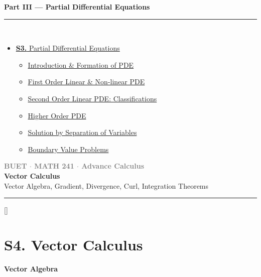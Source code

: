 \documentclass[12pt,a3paper]{article}
\newcommand{\subtopic}[2]{%
  \vspace{10pt}
  \noindent\begin{tcolorbox}[colback=#1!8,colframe=#1,boxrule=0.6pt,arc=4pt,
    left=6pt,right=6pt,top=4pt,bottom=4pt]
    \small\bfseries\textcolor{#1}{#2}
  \end{tcolorbox}
  \vspace{2pt}
}
\newcommand{\secdivider}[3]{%
  \newpage\thispagestyle{empty}%
  \vspace*{\fill}%
  \begin{tcolorbox}[enhanced,colback=#3!6,colframe=#3,boxrule=1.5pt,arc=8pt,
    left=20pt,right=20pt,top=22pt,bottom=22pt,
    shadow={3pt}{-3pt}{0pt}{black!15}]
    \centering
    {\large\textcolor{gray}{\textbf{BUET $\cdot$ MATH 241 $\cdot$ Advance Calculus}}}\\[8pt]
    {\fontsize{26}{32}\selectfont\bfseries\textcolor{#3}{#1}}\\[6pt]
    {\fontsize{15}{19}\selectfont\textcolor{dgray}{#2}}\\[12pt]
    \textcolor{#3!60}{\rule{0.5\textwidth}{0.5pt}}
  \end{tcolorbox}%
  \vspace*{\fill}\newpage%
}
\begin{document}
\begin{tcolorbox}[breakable,colback=cF!5,colframe=cF,boxrule=1pt,arc=5pt,
  left=8pt,right=8pt,top=8pt,bottom=8pt,before skip=4pt]
  {\large\bfseries\textcolor{cF}{Part III --- Partial Differential Equations}}\\[5pt]
  \textcolor{cF!40}{\rule{\textwidth}{0.4pt}}\\[3pt]
  \small\begin{itemize}[leftmargin=1.2em,itemsep=1pt,label={\textcolor{cF}{$\triangleright$}}]
    \item \hyperref[sec:S6]{\textbf{S3.} Partial Differential Equations}
      \begin{itemize}[leftmargin=1.5em,itemsep=0pt,label={\textcolor{cF}{$\cdot$}}]
        \item \hyperref[sub:s6-formation]{Introduction \& Formation of PDE}
        \item \hyperref[sub:s6-first]{First Order Linear \& Non-linear PDE}
        \item \hyperref[sub:s6-second]{Second Order Linear PDE: Classifications}
        \item \hyperref[sub:s6-higher]{Higher Order PDE}
        \item \hyperref[sub:s6-separation]{Solution by Separation of Variables}
        \item \hyperref[sub:s6-bvp]{Boundary Value Problems}
      \end{itemize}
  \end{itemize}
\end{tcolorbox}

\newpage

\secdivider{Vector Calculus}{Vector Algebra, Gradient, Divergence, Curl, Integration Theorems}{cD}
\titleformat{\section}{\large\bfseries\color{cD}}{}{0em}{}[\titlerule]

\section{S4. Vector Calculus}
\label{sec:S4}


\subtopic{cD}{Vector Algebra}
\label{sub:s4-algebra}
\end{document}
